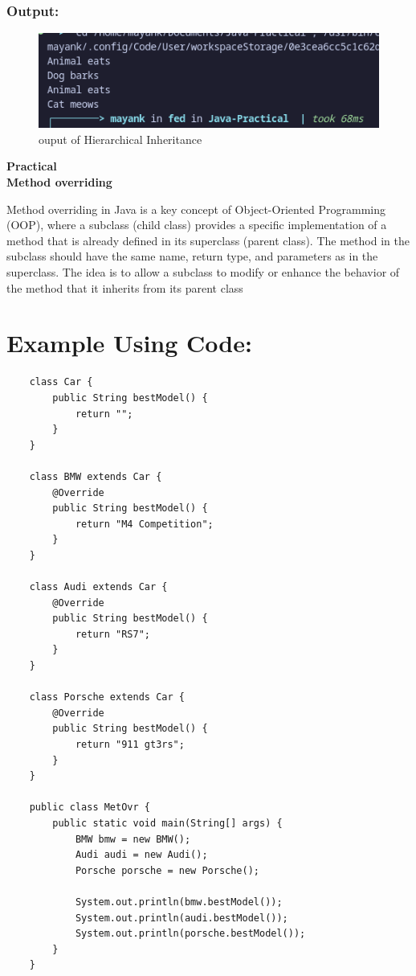 \documentclass[a4paper,12pt]{article}
\newcounter{practicalno} %
\newcommand{\practicaltitle}[1]{
    \stepcounter{practicalno} %
    \newpage
    \begin{center}
        \vspace{1cm}
        \Large\textbf{Practical \thepracticalno} \\
        \vspace{0.5cm}
        \Large\textbf{#1} %
        \normalsize\vspace{1cm}
    \end{center}
}
\begin{document}
\subsubsection{Output:}
\begin{figure}[H]
    \centering
    \includegraphics[width=0.9\linewidth]{images/HInherit.png}
    \caption{ouput of Hierarchical Inheritance}
    \label{fig:sample_image}
\end{figure}

\setcounter{section}{0}

\practicaltitle{Method overriding}
Method overriding in Java is a key concept of Object-Oriented Programming (OOP), where a subclass (child class) provides a specific implementation of a method that is already defined in its superclass (parent class). The method in the subclass should have the same name, return type, and parameters as in the superclass. The idea is to allow a subclass to modify or enhance the behavior of the method that it inherits from its parent class

\section{Example Using Code: }
\begin{lstlisting}
    class Car {
        public String bestModel() {
            return "";
        }
    }
    
    class BMW extends Car {
        @Override
        public String bestModel() {
            return "M4 Competition";
        }
    }
    
    class Audi extends Car {
        @Override
        public String bestModel() {
            return "RS7";
        }
    }
    
    class Porsche extends Car {
        @Override
        public String bestModel() {
            return "911 gt3rs";
        }
    }
    
    public class MetOvr {
        public static void main(String[] args) {
            BMW bmw = new BMW();
            Audi audi = new Audi();
            Porsche porsche = new Porsche();
    
            System.out.println(bmw.bestModel());
            System.out.println(audi.bestModel());
            System.out.println(porsche.bestModel());
        }
    }    
\end{lstlisting}
\end{document}
